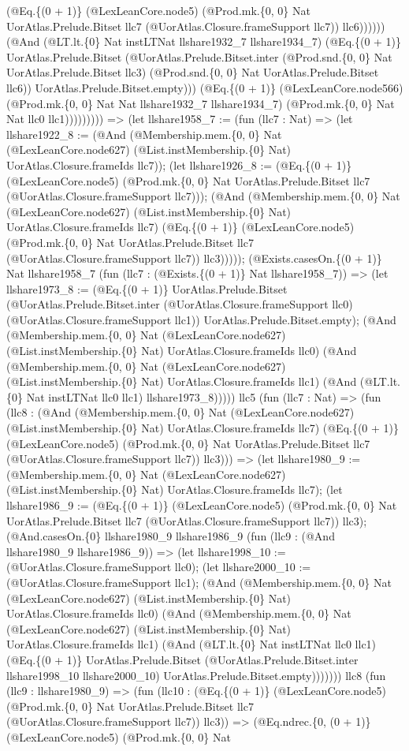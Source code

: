 \documentclass[11pt]{article}
\begin{document}
(@Eq.\{(0 + 1)\} (@LexLeanCore.node5) (@Prod.mk.\{0, 0\} Nat UorAtlas.Prelude.Bitset llc7 (@UorAtlas.Closure.frameSupport llc7)) llc6)))))) (@And (@LT.lt.\{0\} Nat instLTNat llshare1932\_7 llshare1934\_7) (@Eq.\{(0 + 1)\} UorAtlas.Prelude.Bitset (@UorAtlas.Prelude.Bitset.inter (@Prod.snd.\{0, 0\} Nat UorAtlas.Prelude.Bitset llc3) (@Prod.snd.\{0, 0\} Nat UorAtlas.Prelude.Bitset llc6)) UorAtlas.Prelude.Bitset.empty))) (@Eq.\{(0 + 1)\} (@LexLeanCore.node566) (@Prod.mk.\{0, 0\} Nat Nat llshare1932\_7 llshare1934\_7) (@Prod.mk.\{0, 0\} Nat Nat llc0 llc1))))))))) => (let llshare1958\_7 := (fun (llc7 : Nat) => (let llshare1922\_8 := (@And (@Membership.mem.\{0, 0\} Nat (@LexLeanCore.node627) (@List.instMembership.\{0\} Nat) UorAtlas.Closure.frameIds llc7)); (let llshare1926\_8 := (@Eq.\{(0 + 1)\} (@LexLeanCore.node5) (@Prod.mk.\{0, 0\} Nat UorAtlas.Prelude.Bitset llc7 (@UorAtlas.Closure.frameSupport llc7))); (@And (@Membership.mem.\{0, 0\} Nat (@LexLeanCore.node627) (@List.instMembership.\{0\} Nat) UorAtlas.Closure.frameIds llc7) (@Eq.\{(0 + 1)\} (@LexLeanCore.node5) (@Prod.mk.\{0, 0\} Nat UorAtlas.Prelude.Bitset llc7 (@UorAtlas.Closure.frameSupport llc7)) llc3))))); (@Exists.casesOn.\{(0 + 1)\} Nat llshare1958\_7 (fun (llc7 : (@Exists.\{(0 + 1)\} Nat llshare1958\_7)) => (let llshare1973\_8 := (@Eq.\{(0 + 1)\} UorAtlas.Prelude.Bitset (@UorAtlas.Prelude.Bitset.inter (@UorAtlas.Closure.frameSupport llc0) (@UorAtlas.Closure.frameSupport llc1)) UorAtlas.Prelude.Bitset.empty); (@And (@Membership.mem.\{0, 0\} Nat (@LexLeanCore.node627) (@List.instMembership.\{0\} Nat) UorAtlas.Closure.frameIds llc0) (@And (@Membership.mem.\{0, 0\} Nat (@LexLeanCore.node627) (@List.instMembership.\{0\} Nat) UorAtlas.Closure.frameIds llc1) (@And (@LT.lt.\{0\} Nat instLTNat llc0 llc1) llshare1973\_8))))) llc5 (fun (llc7 : Nat) => (fun (llc8 : (@And (@Membership.mem.\{0, 0\} Nat (@LexLeanCore.node627) (@List.instMembership.\{0\} Nat) UorAtlas.Closure.frameIds llc7) (@Eq.\{(0 + 1)\} (@LexLeanCore.node5) (@Prod.mk.\{0, 0\} Nat UorAtlas.Prelude.Bitset llc7 (@UorAtlas.Closure.frameSupport llc7)) llc3))) => (let llshare1980\_9 := (@Membership.mem.\{0, 0\} Nat (@LexLeanCore.node627) (@List.instMembership.\{0\} Nat) UorAtlas.Closure.frameIds llc7); (let llshare1986\_9 := (@Eq.\{(0 + 1)\} (@LexLeanCore.node5) (@Prod.mk.\{0, 0\} Nat UorAtlas.Prelude.Bitset llc7 (@UorAtlas.Closure.frameSupport llc7)) llc3); (@And.casesOn.\{0\} llshare1980\_9 llshare1986\_9 (fun (llc9 : (@And llshare1980\_9 llshare1986\_9)) => (let llshare1998\_10 := (@UorAtlas.Closure.frameSupport llc0); (let llshare2000\_10 := (@UorAtlas.Closure.frameSupport llc1); (@And (@Membership.mem.\{0, 0\} Nat (@LexLeanCore.node627) (@List.instMembership.\{0\} Nat) UorAtlas.Closure.frameIds llc0) (@And (@Membership.mem.\{0, 0\} Nat (@LexLeanCore.node627) (@List.instMembership.\{0\} Nat) UorAtlas.Closure.frameIds llc1) (@And (@LT.lt.\{0\} Nat instLTNat llc0 llc1) (@Eq.\{(0 + 1)\} UorAtlas.Prelude.Bitset (@UorAtlas.Prelude.Bitset.inter llshare1998\_10 llshare2000\_10) UorAtlas.Prelude.Bitset.empty))))))) llc8 (fun (llc9 : llshare1980\_9) => (fun (llc10 : (@Eq.\{(0 + 1)\} (@LexLeanCore.node5) (@Prod.mk.\{0, 0\} Nat UorAtlas.Prelude.Bitset llc7 (@UorAtlas.Closure.frameSupport llc7)) llc3)) => (@Eq.ndrec.\{0, (0 + 1)\} (@LexLeanCore.node5) (@Prod.mk.\{0, 0\} Nat 
\end{document}
